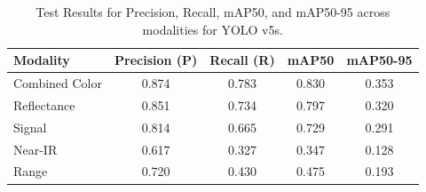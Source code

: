 \documentclass[11pt]{article}
\begin{document}
\begin{table}[ht]
    \centering
    \caption{Test Results for Precision, Recall, mAP50, and mAP50-95 across modalities for YOLO v5s.}
    \begin{tabular}{@{}lcccc@{}}
    \toprule
    \textbf{Modality} & \textbf{Precision (P)} & \textbf{Recall (R)} & \textbf{mAP50} & \textbf{mAP50-95} \\ \midrule
    Combined Color    & 0.874                 & 0.783              & 0.830         & 0.353            \\ 
    Reflectance       & 0.851                 & 0.734              & 0.797         & 0.320            \\ 
    Signal            & 0.814                 & 0.665              & 0.729         & 0.291            \\ 
    Near-IR           & 0.617                 & 0.327              & 0.347         & 0.128            \\ 
    Range             & 0.720                 & 0.430              & 0.475         & 0.193            \\ \bottomrule
    \end{tabular}
    \label{tab:results}
\end{table}
\end{document}

